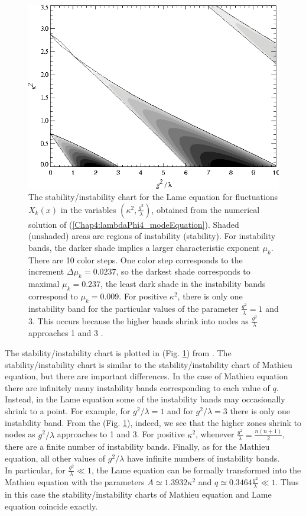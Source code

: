 \documentclass[11pt,a4paper,twoside]{book}
\begin{document}
\begin{figure}
	\centering
	\includegraphics[width=0.6\linewidth, height=0.3\textheight]{Images/Chap4/ConformalTheory_Fig4}
	\caption{The stability/instability chart for the Lame equation for fluctuations $ X_{k}(x) $ in the variables $ (\kappa^{2},\frac{g^{2}}{\lambda}) $, obtained from the numerical solution of (\ref{Chap4:lambdaPhi4_modeEquation}). Shaded (unshaded) areas are regions of instability (stability). For instability bands, the darker shade implies a larger characteristic exponent $\mu_{k}$. There are 10 color steps. One color step corresponds to the increment $\Delta \mu_{k} = 0.0237$, so the darkest shade corresponds to maximal $\mu_{k}=0.237$, the least dark shade in the instability bands correspond to $\mu_{k}=0.009$. For positive $\kappa^{2}$, there is only one instability band for the particular values of the parameter $ \frac{g^{2}}{\lambda}=1 $ and 3. This occurs because the higher bands shrink into nodes as $ \frac{g^{2}}{\lambda} $ approaches 1 and 3 \cite{Chap4:ModelLambdaPhi4Reference}.  }
	\label{fig:conformaltheoryfig4}
\end{figure}

The stability/instability chart is plotted in (Fig. \ref{fig:conformaltheoryfig4}) from \cite{Chap4:ModelLambdaPhi4Reference}. The stability/instability chart is similar to the stability/instability chart of Mathieu equation, but there are important differences. In the case of Mathieu equation there are infinitely many instability bands corresponding to each value of $ q $. Instead, in the Lame equation some of the instability bands may occasionally shrink to a point. For example, for $ g^{2}/\lambda=1 $ and for $ g^{2}/\lambda=3 $ there is only one instability band. From the (Fig. \ref{fig:conformaltheoryfig4}), indeed, we see that the higher zones shrink to nodes as $ g^{2}/\lambda  $ approaches to 1 and 3. For positive $\kappa^{2}$, whenever $ \frac{g^{2}}{\lambda}=\frac{n(n+1)}{2} $, there are a finite number of instability bands. Finally, as for the Mathieu equation, all other values of $ g^{2}/\lambda $ have infinite numbers of instability bands. \\
In particular, for $\frac{g^{2}}{\lambda} \ll 1  $, the Lame equation can be formally transformed into the Mathieu equation with the parameters $ A\simeq 1.3932 \kappa^{2} $ and $ q\simeq 0.3464 \frac{g^{2}}{\lambda} \ll 1 $. Thus in this case the stability/instability charts of Mathieu equation and Lame equation coincide exactly.
\end{document}

